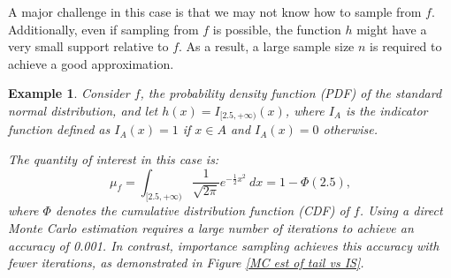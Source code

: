 \documentclass{article}\usepackage[]{graphicx}\usepackage[]{xcolor}
\newtheorem{example}{Example}
\begin{document}
A major challenge in this case is that we may not know how to sample from $f$. Additionally, even if sampling from $f$ is possible, the function $h$ might have a very small support relative to $f$. As a result, a large sample size $n$ is required to achieve a good approximation.

\begin{example}\label{Estimation of the tail of standard normal dist MC vs IS}
Consider $f$, the probability density function (PDF) of the standard normal distribution, and let $h(x) = I_{[2.5, +\infty)}(x)$, where $I_A$ is the indicator function defined as $I_A(x) = 1$ if $x \in A$ and $I_A(x) = 0$ otherwise.

The quantity of interest in this case is:
\begin{equation*}
\mu_f = \int_{[2.5, +\infty)} \frac{1}{\sqrt{2\pi}} e^{-\frac{1}{2}x^2}~dx = 1 - \Phi(2.5),
\end{equation*}
where $\Phi$ denotes the cumulative distribution function (CDF) of $f$. Using a direct Monte Carlo estimation requires a large number of iterations to achieve an accuracy of 0.001. In contrast, importance sampling achieves this accuracy with fewer iterations, as demonstrated in Figure \ref{MC est of tail vs IS}. 


\end{example}
\end{document}
